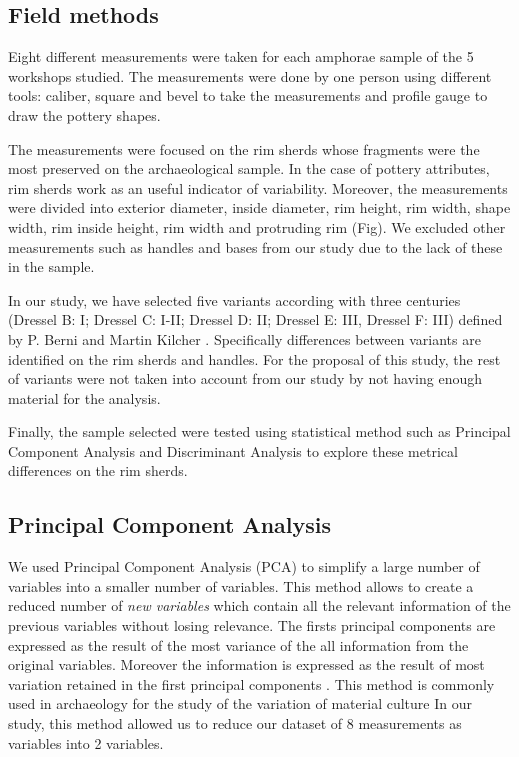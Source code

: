 \documentclass[review]{elsarticle}
\begin{document}
\subsection{Field methods}


Eight different measurements were taken for each amphorae sample of the 5 workshops studied. The measurements were done by one person using different tools: caliber, square and bevel to take the measurements and profile gauge to draw the pottery shapes. 

The measurements were focused on the rim sherds whose fragments were the most preserved on the archaeological sample. In the case of pottery attributes, rim sherds work as an useful indicator of variability. Moreover, the measurements were divided into exterior diameter, inside diameter, rim height, rim width, shape width, rim inside height, rim width and protruding rim (Fig). We excluded other measurements such as handles and bases from our study due to the lack of these in the sample.    

In our study, we have selected five variants according with three centuries
(Dressel B: I; Dressel C: I-II; Dressel D: II; Dressel E: III, Dressel F: III) defined by P. Berni \citep{berni_millet_epigrafianforica_2008} and Martin Kilcher \citep{martin-kilcher_romischen_1994}. Specifically differences between variants are identified on the rim sherds and handles. For the proposal of this study, the rest of variants were not taken into account from our study by not having enough material for the analysis. 

Finally, the sample selected were tested using statistical method such as Principal Component Analysis and Discriminant Analysis to explore these metrical differences on the rim sherds. 
 

\subsection{Principal Component Analysis}


We used Principal Component Analysis (PCA) to simplify a large number of variables into a smaller number of variables. This method allows to create a reduced number of \textit{new variables} which contain all the relevant information of the previous variables without losing relevance. The firsts principal components are expressed as the result of the most variance of the all information from the original variables. Moreover the information is expressed as the result of most variation retained in the first principal components \citep{jolliffe_principal_2002, shennan_quantifying_1997}. 
This method is commonly used in archaeology for the study of the variation of material culture \citep{li_crossbows_2014, schillinger_differences_2016} 
In our study, this method allowed us to reduce our dataset of 8 measurements as variables into 2 variables. 
\end{document}
